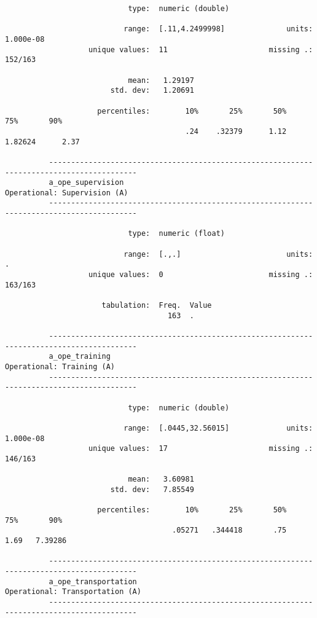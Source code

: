 \documentclass{article}
\begin{document}
\begin{verbatim}
                            type:  numeric (double)
          
                           range:  [.11,4.2499998]              units:  1.000e-08
                   unique values:  11                       missing .:  152/163
          
                            mean:   1.29197
                        std. dev:   1.20691
          
                     percentiles:        10%       25%       50%       75%       90%
                                         .24    .32379      1.12   1.82624      2.37
          
          ------------------------------------------------------------------------------------------
          a_ope_supervision                                             Operational: Supervision (A)
          ------------------------------------------------------------------------------------------
          
                            type:  numeric (float)
          
                           range:  [.,.]                        units:  .
                   unique values:  0                        missing .:  163/163
          
                      tabulation:  Freq.  Value
                                     163  .
          
          ------------------------------------------------------------------------------------------
          a_ope_training                                                   Operational: Training (A)
          ------------------------------------------------------------------------------------------
          
                            type:  numeric (double)
          
                           range:  [.0445,32.56015]             units:  1.000e-08
                   unique values:  17                       missing .:  146/163
          
                            mean:   3.60981
                        std. dev:   7.85549
          
                     percentiles:        10%       25%       50%       75%       90%
                                      .05271   .344418       .75      1.69   7.39286
          
          ------------------------------------------------------------------------------------------
          a_ope_transportation                                       Operational: Transportation (A)
          ------------------------------------------------------------------------------------------
          

\end{verbatim}
\end{document}
